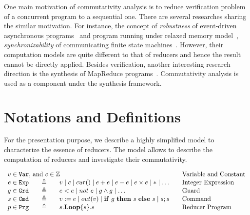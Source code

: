 \documentclass{llncs}
\newcommand{\Var}{\mathtt{Var}}
\newcommand{\Exp}{\mathtt{Exp}}
\newcommand{\Cmd}{\mathtt{Cmd}}
\newcommand{\Grd}{\mathtt{Grd}}
\newcommand{\Prg}{\mathtt{Prg}}
\newcommand{\cur}{cur()}
\newcommand{\ite}[3]{
	 \ifmmode
	 \mathbf{if}\ #1 \ \mathbf{then}\ #2\  \mathbf{else}\ #3
	 \else
	 \textbf{if}\ #1 \ \textbf{then}\ #2\  \textbf{else}\ #3
	 \fi}
\newcommand{\rloop}{
	\ifmmode
	\mathbf{Loop}
	\else
	\textbf{Loop}
	\fi}
\newcommand{\Z}{\mathbb{Z}}
\begin{document}
One main motivation of commutativity analysis is to reduce verification problem of a concurrent program to a sequential one. There are several researches sharing the similar motivation. For instance, the concept of \emph{robustness} of event-driven asynchronous programs~\cite{ahmed2017:robustness}  and program running under relaxed memory model~\cite{ahmed2013:robustness,AbdullaACLR13,AbdullaACLR12}, \emph{synchronizability} of communicating finite state machines~\cite{FinkelL17,basu2012synchronizability,basu2011choreography}. However, their computation models are quite different to that of reducers and hence the result cannot be directly applied. Besides verification, another interesting research direction is the synthesis of MapReduce programs~\cite{SmithA16}. Commutativity analysis is used as a component under the synthesis framework.

\section{Notations and Definitions}
\label{section:integer-reducers}
For the presentation purpose, we describe a highly simplified model to characterize the essence of reducers. The model allows to describe the computation of reducers and investigate their commutativity.

\begin{equation*}
\begin{array}{rclcl}
\multicolumn{3}{l}{v\in \Var\mbox{, and }c \in \Z}&&\textmd{Variable and Constant}\\
e \in \Exp    &\ \ \  {\triangleq}\ \ \   & v \mid c \mid \cur \mid e + e \mid e - e \mid e \times e \mid *\mid\ldots & &\textmd{Integer Expression}\\
g\in \Grd  & {\triangleq}  & e < e \mid not\ e \mid g \wedge g  \mid \ldots& & \textmd{Guard}\\
s\in \Cmd  & {\triangleq}  & v:= e \mid out(v) \mid \ite{g}{s}{s} \mid s;s && \textmd{Command}\\
p\in \Prg  & {\triangleq}  & s.\rloop\{s\}.s&& \textmd{Reducer Program}\\
\end{array}
\end{equation*}
\end{document}
